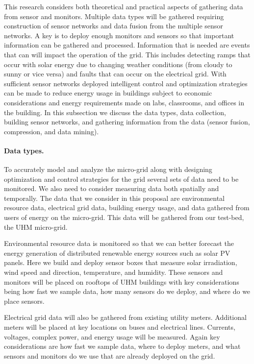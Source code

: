 This research considers both theoretical and practical aspects of gathering
data from sensor and monitors.  Multiple data types will be gathered
requiring construction of sensor networks and data fusion from the multiple
sensor networks.  A key is to deploy enough monitors and sensors so that
important information can be gathered and processed.  Information that is
needed are events that can will impact the operation of the grid.  This
includes detecting ramps that occur with solar energy due to changing
weather conditions (from cloudy to sunny or vice versa) and faults that can
occur on the electrical grid.  With sufficient sensor networks deployed
intelligent control and optimization strategies can be made to reduce
energy usage in buildings subject to economic considerations and energy
requirements made on labs, classrooms, and offices in the building.  In
this subsection we discuss the data types, data collection, building sensor
networks, and gathering information from the data (sensor fusion,
compression, and data mining).
 
\paragraph{Data types.}
 
To accurately model and analyze the micro-grid along with designing
optimization and control strategies for the grid several sets of data need
to be monitored.  We also need to consider measuring data both spatially
and temporally.  The data that we consider in this proposal are
environmental resource data, electrical grid data, building energy usage,
and data gathered from users of energy on the micro-grid.  This data will
be gathered from our test-bed, the UHM micro-grid.
 
Environmental resource data is monitored so that we can better forecast the
energy generation of distributed renewable energy sources such as solar PV
panels.  Here we build and deploy sensor boxes that measure solar
irradiation, wind speed and direction, temperature, and humidity.  These
sensors and monitors will be placed on rooftops of UHM buildings with key
considerations being how fast we sample data, how many sensors do we
deploy, and where do we place sensors.
 
Electrical grid data will also be gathered from existing utility meters.
Additional meters will be placed at key locations on buses and electrical
lines.  Currents, voltages, complex power, and energy usage will be
measured.  Again key considerations are how fast we sample data, where to
deploy meters, and what sensors and monitors do we use that are already
deployed on the grid.
 
